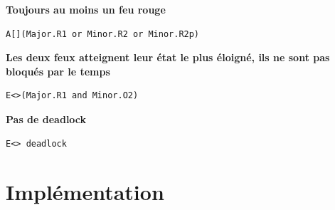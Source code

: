 \documentclass[11pt]{article}
\begin{document}
\textbf{Toujours au moins un feu rouge}
\begin{verbatim}
A[](Major.R1 or Minor.R2 or Minor.R2p)
\end{verbatim}

\textbf{Les deux feux atteignent leur état le plus éloigné, ils ne sont pas bloqués par le temps}
\begin{verbatim}
E<>(Major.R1 and Minor.O2)
\end{verbatim}

\textbf{Pas de deadlock}
\begin{verbatim}
E<> deadlock
\end{verbatim}

\section{Implémentation}
\end{document}
